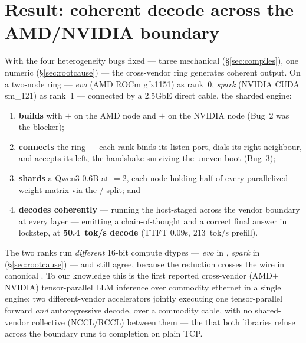 \documentclass[11pt]{article}
\begin{document}
\section{Result: coherent decode across the AMD/NVIDIA boundary}
\label{sec:result}

With the four heterogeneity bugs fixed --- three mechanical (\S\ref{sec:compiles}), one numeric
(\S\ref{sec:rootcause}) --- the cross-vendor ring generates coherent output. On a two-node ring ---
\emph{evo} (AMD ROCm gfx1151) as rank~0, \emph{spark} (NVIDIA CUDA sm\_121) as rank~1 --- connected by a
2.5GbE direct cable, the sharded engine:

\begin{enumerate}[leftmargin=1.5em,itemsep=1pt]
\item \textbf{builds} with  $+$  on the AMD node and  $+$  on
the NVIDIA node (Bug~2 was the blocker);
\item \textbf{connects} the ring --- each rank binds its listen port, dials its right neighbour, and
accepts its left, the handshake surviving the uneven boot (Bug~3);
\item \textbf{shards} a Qwen3-0.6B at $=$2, each node holding half of every parallelized
weight matrix via the / split; and
\item \textbf{decodes coherently} --- running the host-staged   across the
vendor boundary at every layer --- emitting a chain-of-thought and a correct final answer in lockstep, at
\textbf{50.4~tok/s decode} (TTFT 0.09s, 213~tok/s prefill).
\end{enumerate}

The two ranks run \emph{different} 16-bit compute dtypes --- \emph{evo} in , \emph{spark} in
 (\S\ref{sec:rootcause}) --- and still agree, because the reduction crosses the wire in
canonical . To our knowledge this is the first reported cross-vendor (AMD$+$NVIDIA)
tensor-parallel LLM inference over commodity ethernet in a single engine: two different-vendor
accelerators jointly executing one tensor-parallel forward \emph{and} autoregressive decode, over a
commodity cable, with no shared-vendor collective (NCCL/RCCL) between them --- the  that
both libraries refuse across the boundary runs to completion on plain TCP.
\end{document}

